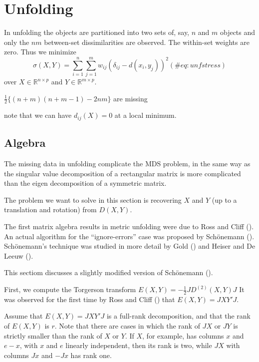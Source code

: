 \documentclass[
  12pt,
  letterpaper,
  DIV=11,
  numbers=noendperiod]{scrreprt}
\theoremstyle{remark}
\begin{document}

\chapter{Unfolding}\label{chunfolding}

In unfolding the objects are partitioned into two sets of, say, \(n\)
and \(m\) objects and only the \(nm\) between-set dissimilarities are
observed. The within-set weights are zero. Thus we minimize
\begin{equation}
\sigma(X,Y)=\sum_{i=1}^n\sum_{j=1}^m w_{ij}(\delta_{ij}-d(x_i,y_j))^2
(\#eq:unfstress)
\end{equation} over \(X\in\mathbb{R}^{n\times p}\) and
\(Y\in\mathbb{R}^{m\times p}\).

\(\frac12\{(n+m)(n+m-1)-2nm\}\) are missing

note that we can have \(d_{ij}(X)=0\) at a local minimum.

\section{Algebra}\label{algebra-1}

The missing data in unfolding complicate the MDS problem, in the same
way as the singular value decomposition of a rectangular matrix is more
complicated than the eigen decomposition of a symmetric matrix.

The problem we want to solve in this section is recovering \(X\) and
\(Y\) (up to a translation and rotation) from \(D(X,Y)\).

The first matrix algebra results in metric unfolding were due to Ross
and Cliff (). An actual algorithm for
the ``ignore-errors'' case was proposed by Schönemann
(). Schönemann's technique was
studied in more detail by Gold () and Heiser
and De Leeuw ().

This sectiom discusses a slightly modified version of Schönemann
().

First, we compute the Torgerson transform
\(E(X,Y)=-\frac12 JD^{(2)}(X,Y)J\) It was observed for the first time by
Ross and Cliff () that
\(E(X,Y)=JXY'J\).

Assume that \(E(X,Y)=JXY'J\) is a full-rank decomposition, and that the
rank of \(E(X,Y)\) is \(r\). Note that there are cases in which the rank
of \(JX\) or \(JY\) is strictly smaller than the rank of \(X\) or \(Y\).
If \(X\), for example, has columns \(x\) and \(e-x\), with \(x\) and
\(e\) linearly independent, then its rank is two, while \(JX\) with
columns \(Jx\) and \(-Jx\) has rank one.
\end{document}
